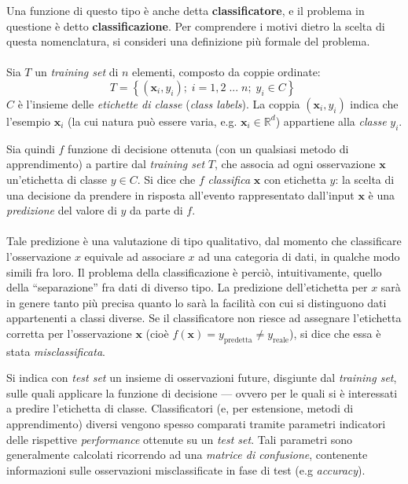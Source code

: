 Una funzione di questo tipo è anche detta \textbf{classificatore}, e il problema in questione è detto \textbf{classificazione}. Per comprendere i motivi dietro la scelta di questa nomenclatura, si consideri una definizione più formale del problema.

\paragraph{}
Sia $T$ un \textit{training set} di $n$ elementi, composto da coppie ordinate:
\begin{equation}
	T = \left\{ { (\boldsymbol{x}_i, y_i);\; i = 1, 2 \;...\; n;\; y_i \in C }\right\} \;
\end{equation}
$C$ è l'insieme delle \textit{etichette di classe} (\textit{class labels}). La coppia $(\boldsymbol{x}_i, y_i)$ indica che l'esempio $\boldsymbol{x}_i$ (la cui natura può essere varia, e.g. $\boldsymbol{x}_i \in \mathbb{R}^d$) appartiene alla \textit{classe} $y_i$.

Sia quindi $f$ funzione di decisione ottenuta (con un qualsiasi metodo di apprendimento) a partire dal \textit{training set} $T$, che associa ad ogni osservazione $\boldsymbol{x}$ un'etichetta di classe $y \in C$.	Si dice che $f$ \textit{classifica} $\boldsymbol{x}$ con etichetta $y$: la scelta di una decisione da prendere in risposta all'evento rappresentato dall'input $\boldsymbol{x}$ è una \textit{predizione} del valore di $y$ da parte di $f$.
		
\paragraph{}		
Tale predizione è una valutazione di tipo qualitativo, dal momento che classificare l'osservazione $x$ equivale ad associare $x$ ad una categoria di dati, in qualche modo simili fra loro.  
Il problema della classificazione è perciò, intuitivamente,  quello della ``separazione'' fra dati di diverso tipo. La predizione dell'etichetta per $x$ sarà in genere tanto più precisa quanto lo sarà la facilità con cui si distinguono dati appartenenti a classi diverse. Se il classificatore non riesce ad assegnare l'etichetta corretta per l'osservazione $\boldsymbol{x}$ (cioè $f(\boldsymbol{x}) = y_{\text{predetta}} \neq y_{\text{reale}}$), si dice che essa è stata \textit{misclassificata}.

Si indica con \textit{test set} un insieme di osservazioni future, disgiunte dal \textit{training set}, sulle quali applicare la funzione di decisione --- ovvero per le quali si è interessati a predire l'etichetta di classe.
Classificatori (e, per estensione, metodi di apprendimento) diversi vengono spesso comparati tramite parametri indicatori delle rispettive \textit{performance} ottenute su un \textit{test set}.
Tali parametri sono generalmente calcolati ricorrendo ad una \textit{matrice di confusione}, contenente informazioni sulle osservazioni misclassificate in fase di test (e.g \textit{accuracy}).

